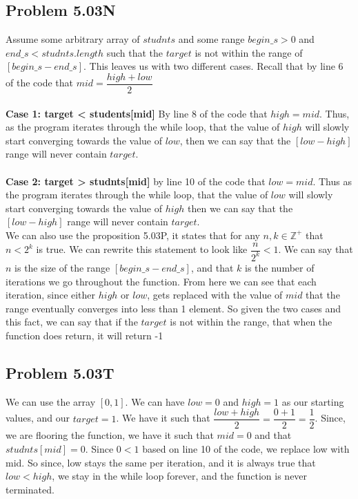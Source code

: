\documentclass[12pt]{article}
\newcommand{\Z}{\mathbb{Z}}
\begin{document}
\subsection*{Problem 5.03N}
Assume some arbitrary array of $studnts$ and some range $begin\_s > 0$ and $end\_s < studnts.length$ such that the $target$ is not within the range of $[begin\_s - end\_s]$. This leaves us with two different cases. Recall that by line 6 of the code that $mid = \dfrac{high + low}{2}$\\\\
\textbf{Case 1: target < students[mid]} By line 8 of the code that $high = mid$. Thus, as the program iterates through the while loop, that the value of $high$ will slowly start converging towards the value of $low$, then we can say that the $[low - high]$ range will never contain $target$.\\\\
\textbf{Case 2: target > studnts[mid]} by line 10 of the code that $low = mid$. Thus as the program iterates through the while loop, that the value of $low$ will slowly start converging towards the value of $high$ then we can say that the $[low - high]$ range will never contain $target$.\\
We can also use the proposition 5.03P, it states that for any $n, k \in \Z^{+}$ that $n < 2^k$ is true. We can rewrite this statement to look like $\dfrac{n}{2^k} < 1$. We can say that $n$ is the size of the range $[begin\_s - end\_s]$, and that $k$ is the number of iterations we go throughout the function. From here we can see that each iteration, since either $high$ or $low$, gets replaced with the value of $mid$ that the range eventually converges into less than 1 element. So given the two cases and this fact, we can say that if the $target$ is not within the range, that when the function does return, it will return -1


\subsection*{Problem 5.03T}
We can use the array $[0, 1]$. We can have $low = 0$ and $high = 1$ as our starting values, and our $target = 1$. We have it such that $\dfrac{low + high}{2} = \dfrac{0 + 1}{2} = \dfrac{1}{2}$. Since, we are flooring the function, we have it such that $mid = 0$ and that $studnts[mid] = 0$. Since $0 < 1$ based on line 10 of the code, we replace low with mid. So since, low stays the same per iteration, and it is always true that $low < high$, we stay in the while loop forever, and the function is never terminated.
\end{document}
